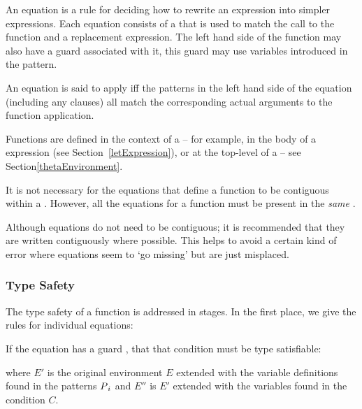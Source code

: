\label{equations}
An equation is a rule for deciding how to rewrite an expression into simpler expressions. Each equation consists of a  that is used to match the call to the function and a replacement expression. The left hand side of the function may also have a guard associated with it, this guard may use variables introduced in the pattern.

\begin{aside}
An equation is said to apply iff the patterns in the left hand side of the equation (including any  clauses) all match the corresponding actual arguments to the function application.
\end{aside}


\noindent
Functions are defined in the context of a  -- for example, in the body of a  expression (see Section~\vref{letExpression}), or at the top-level of a  -- see Section\vref{thetaEnvironment}.

It is not necessary for the equations that define a function to be contiguous within a . However, all the equations for a function must be present in the \emph{same} . 

\begin{aside}
Although equations do not need to be contiguous; it is recommended that they are written contiguously where possible. This helps to avoid a certain kind of error where equations seem to `go missing' but are just misplaced.
\end{aside}

\subsubsection{Type Safety}
The type safety of a function is addressed in stages. In the first place, we give the rules for individual equations:
\begin{prooftree}
\end{prooftree}
If the equation has a guard , that that condition must be type satisfiable:
\begin{prooftree}
\end{prooftree}
where $E'$ is the original environment $E$ extended with the variable definitions found in the patterns $P\subi$ and $E''$ is $E'$ extended with the variables found in the condition $C$.

